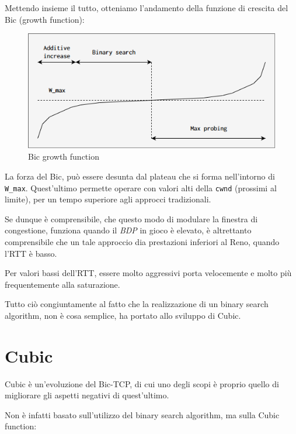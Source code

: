 Mettendo insieme il tutto, otteniamo l'andamento della funzione di crescita del Bic (growth function):

\begin{figure} [H]

\center
\caption{Bic growth function}
\includegraphics[scale=0.8]{chapters/A_cubic/img/growth_function.png}

\end{figure}

La forza del Bic, può essere desunta dal plateau che si forma nell'intorno di \texttt{W\_max}. Quest'ultimo permette operare con valori alti della \texttt{cwnd} (prossimi al limite), per un tempo superiore agli approcci tradizionali. \bigskip

Se dunque è comprensibile, che questo modo di modulare la finestra di congestione, funziona quando il \textit{BDP} in gioco è elevato, è altrettanto comprensibile che un tale approccio dia prestazioni inferiori al Reno, quando l'RTT è basso. \bigskip

Per valori bassi dell'RTT, essere molto aggressivi porta velocemente e molto più frequentemente alla saturazione. \bigskip 

Tutto ciò congiuntamente al fatto che la realizzazione di un binary search algorithm, non è cosa semplice, ha portato allo sviluppo di Cubic.

\section{Cubic}

Cubic è un'evoluzione del Bic-TCP, di cui uno degli scopi è proprio quello di migliorare gli aspetti negativi di quest'ultimo. \bigskip

Non è infatti basato sull'utilizzo del binary search algorithm, ma sulla Cubic function:

